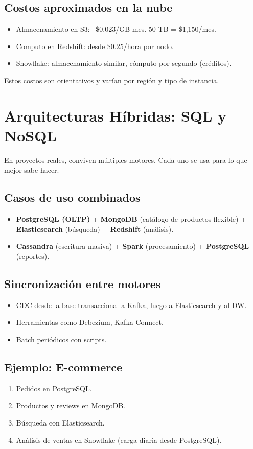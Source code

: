 \documentclass[12pt,a4paper,openany,oneside]{book}
\begin{document}
\section{Costos aproximados en la nube}
\begin{itemize}
    \item Almacenamiento en S3: ~\$0.023/GB-mes. 50 TB = \$1,150/mes.
    \item Computo en Redshift: desde \$0.25/hora por nodo.
    \item Snowflake: almacenamiento similar, cómputo por segundo (créditos).
\end{itemize}
Estos costos son orientativos y varían por región y tipo de instancia.

\chapter{Arquitecturas Híbridas: SQL y NoSQL}
En proyectos reales, conviven múltiples motores. Cada uno se usa para lo que mejor sabe hacer.

\section{Casos de uso combinados}
\begin{itemize}
    \item \textbf{PostgreSQL (OLTP)} + \textbf{MongoDB} (catálogo de productos flexible) + \textbf{Elasticsearch} (búsqueda) + \textbf{Redshift} (análisis).
    \item \textbf{Cassandra} (escritura masiva) + \textbf{Spark} (procesamiento) + \textbf{PostgreSQL} (reportes).
\end{itemize}

\section{Sincronización entre motores}
\begin{itemize}
    \item CDC desde la base transaccional a Kafka, luego a Elasticsearch y al DW.
    \item Herramientas como Debezium, Kafka Connect.
    \item Batch periódicos con scripts.
\end{itemize}

\section{Ejemplo: E-commerce}
\begin{enumerate}
    \item Pedidos en PostgreSQL.
    \item Productos y reviews en MongoDB.
    \item Búsqueda con Elasticsearch.
    \item Análisis de ventas en Snowflake (carga diaria desde PostgreSQL).
\end{enumerate}
\end{document}
